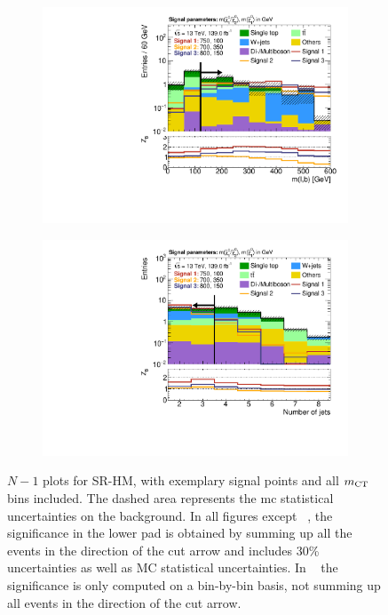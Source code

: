 \begin{figure}
\begin{subfigure}[b]{0.45\linewidth}
		\centering\includegraphics[width=\textwidth]{n1_SRHM_mct_bins/mlb1.pdf}
		\vspace{-2em}
		\caption{\label{fig:Wh_reopt_second_round_n1_srhm_mlb1}}
	\end{subfigure}%
	\begin{subfigure}[b]{0.45\linewidth}
		\centering\includegraphics[width=\textwidth]{n1_SRHM_mct_bins/nJet30.pdf}
		\vspace{-2em}
		\caption{\label{fig:Wh_reopt_second_round_n1_srhm_njet}}
	\end{subfigure}
	\caption{$N-1$ plots for SR-HM, with exemplary signal points and all $m_{\textrm{CT}}$ bins included. The dashed area represents the \gls{mc} statistical uncertainties on the background. In all figures except \figname~, the significance in the lower pad is obtained by summing up all the events in the direction of the cut arrow and includes 30\% uncertainties as well as MC statistical uncertainties. In \figname~ the significance is only computed on a bin-by-bin basis, \ie not summing up all events in the direction of the cut arrow.}
	\label{fig:Wh_reopt_second_round_n1_srhm}
\end{figure}




